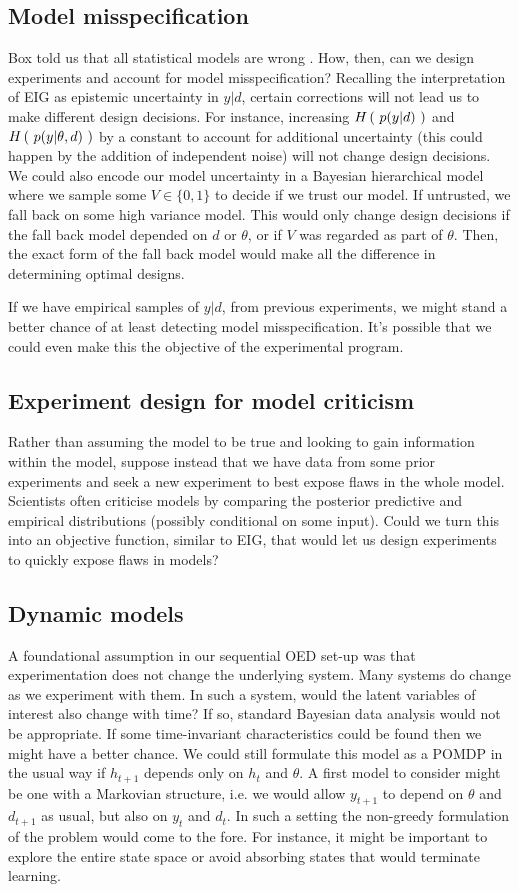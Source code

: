 \subsection{Model misspecification}
Box told us that all statistical models are wrong \cite{box1976}. How, then, can we design experiments and account for model misspecification? Recalling the interpretation of EIG as epistemic uncertainty in $y|d$, certain corrections will not lead us to make different design decisions. For instance, increasing $H\left(\ p(y|d)\ \right)$ and $H\left(\ p(y|\theta,d)\ \right)$ by a constant to account for additional uncertainty (this could happen by the addition of independent noise) will not change design decisions. We could also encode our model uncertainty in a Bayesian hierarchical model where we sample some $V \in \{0, 1\}$ to decide if we trust our model. If untrusted, we fall back on some high variance model. This would only change design decisions if the fall back model depended on $d$ or $\theta$, or if $V$ was regarded as part of $\theta$. Then, the exact form of the fall back model would make all the difference in determining optimal designs.

If we have empirical samples of $y|d$, from previous experiments, we might stand a better chance of at least detecting model misspecification. It's possible that we could even make this the objective of the experimental program.

\subsection{Experiment design for model criticism}
Rather than assuming the model to be true and looking to gain information within the model, suppose instead that we have data from some prior experiments and seek a new experiment to best expose flaws in the whole model. Scientists often criticise models by comparing the posterior predictive and empirical distributions (possibly conditional on some input). Could we turn this into an objective function, similar to EIG, that would let us design experiments to quickly expose flaws in models?


\subsection{Dynamic models}
A foundational assumption in our sequential OED set-up was that experimentation does not change the underlying system. Many systems do change as we experiment with them. In such a system, would the latent variables of interest also change with time? If so, standard Bayesian data analysis would not be appropriate. If some time-invariant characteristics could be found then we might have a better chance. We could still formulate this model as a POMDP in the usual way if $h_{t+1}$ depends only on $h_t$ and $\theta$. A first model to consider might be one with a Markovian structure, i.e. we would allow $y_{t+1}$ to depend on $\theta$ and $d_{t+1}$ as usual, but also on $y_t$ and $d_t$. In such a setting the non-greedy formulation of the problem would come to the fore. For instance, it might be important to explore the entire state space or avoid absorbing states that would terminate learning.


